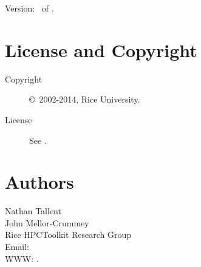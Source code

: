 \documentclass[english]{article}
\begin{document}
Version: \Version\ of \Date.

\section{License and Copyright}

\begin{description}
\item[Copyright] \copyright\ 2002-2014, Rice University.
\item[License] See .
\end{description}

\section{Authors}

\noindent
Nathan Tallent \\
John Mellor-Crummey \\
Rice HPCToolkit Research Group \\
Email:  \\
WWW: .

\LatexManEnd
\end{document}
